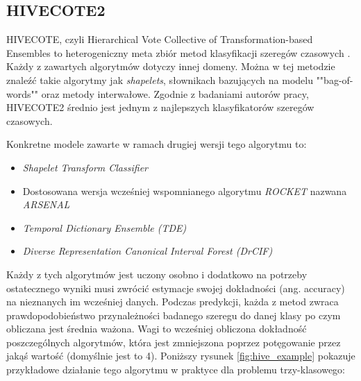         \subsection{HIVECOTE2}
            HIVECOTE, czyli Hierarchical Vote Collective of Transformation-based Ensembles to heterogeniczny meta zbiór metod klasyfikacji szeregów czasowych \cite{HiveCote}. Każdy z zawartych algorytmów dotyczy innej domeny. Można w tej metodzie znaleźć takie algorytmy jak \textit{shapelets}, słownikach bazujących na modelu ""bag-of-words"" oraz metody interwałowe. Zgodnie z badaniami autorów pracy, HIVECOTE2 średnio jest jednym z najlepszych klasyfikatorów szeregów czasowych.
            
            Konkretne modele zawarte w ramach drugiej wersji tego algorytmu to: 
            \begin{itemize}
                \item \textit{Shapelet Transform Classifier}
                \item Dostosowana wersja wcześniej wspomnianego algorytmu \textit{ROCKET} nazwana \textit{ARSENAL}
                \item \textit{Temporal Dictionary Ensemble (TDE)}
                \item \textit{Diverse Representation Canonical Interval Forest (DrCIF)}
            \end{itemize}
            Każdy z tych algorytmów jest uczony osobno i dodatkowo na potrzeby ostatecznego wyniki musi zwrócić estymacje swojej dokładności (ang. accuracy) na nieznanych im wcześniej danych. Podczas predykcji, każda z metod zwraca prawdopodobieństwo przynależności badanego szeregu do danej klasy po czym obliczana jest średnia ważona. Wagi to wcześniej obliczona dokładność poszczególnych algorytmów, która jest zmniejszona poprzez potęgowanie przez jakąś wartość (domyślnie jest to 4). Poniższy rysunek \ref{fig:hive_example} pokazuje przykładowe działanie tego algorytmu w praktyce dla problemu trzy-klasowego:
            
